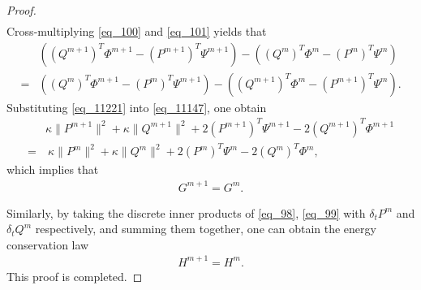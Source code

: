 \documentclass[preprint,compress,3p,10pt,fleqn]{elsarticle}
\numberwithin{equation}{section}
\begin{document}
\begin{proof}
\begin{align}
\end{align}
Cross-multiplying \eqref{eq_100} and \eqref{eq_101} yields that
\begin{align}\label{eq_11221}
&((Q^{m+1})^{T}\varPhi^{m+1}-(P^{m+1})^{T}\Psi^{m+1})-((Q^{m})^{T}\varPhi^{m}-(P^{m})^{T}\Psi^{m})\nonumber\\
=&((Q^{m})^{T}\varPhi^{m+1}-(P^{m})^{T}\Psi^{m+1})-((Q^{m+1})^{T}\varPhi^{m}-(P^{m+1})^{T}\Psi^{m}).
\end{align}
Substituting \eqref{eq_11221} into \eqref{eq_11147}, one obtain
\begin{align}
&\kappa \|P^{m+1}\|^2+\kappa \|Q^{m+1}\|^2+2(P^{m+1})^{T}\Psi^{m+1}-2(Q^{m+1})^{T}\varPhi^{m+1}\nonumber
\\=&~\kappa \|P^{m}\|^2+\kappa \|Q^{m}\|^2+2(P^{m})^{T}\Psi^{m}-2(Q^{m})^{T}\varPhi^{m},\label{eq_11155}
\end{align}
which implies that
\begin{align}\label{eq_11149}
G^{m+1}=G^{m} .
\end{align}

Similarly, by taking the discrete inner products of \eqref{eq_98}, \eqref{eq_99} with $\delta_t P^{m}$ and $\delta_t Q^{m}$ respectively, and summing them together, one can obtain the energy conservation law
\begin{align}\label{eq_11156}
H^{m+1}=H^{m}.
\end{align}
This proof is completed.
\end{proof}
\end{document}

